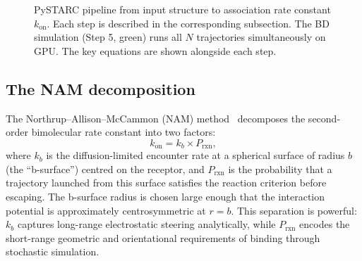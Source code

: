 \documentclass[journal=jctcce,manuscript=article,layout=twocolumn]{achemso}
\newcommand{\kon}{k_{\mathrm{on}}}
\newcommand{\Prxn}{P_{\mathrm{rxn}}}
\begin{document}
\begin{figure}[t]
\caption{PySTARC pipeline from input structure to association rate constant $\kon$.
Each step is described in the corresponding subsection.
The BD simulation (Step 5, green) runs all $N$ trajectories simultaneously on GPU.
The key equations are shown alongside each step.}
\label{fig:flowchart}
\end{figure}

\subsection{The NAM decomposition}

The Northrup--Allison--McCammon (NAM) method~\cite{Northrup1984}
decomposes the second-order bimolecular rate constant into two
factors:
\begin{equation}
\kon = k_b \times \Prxn,
\label{eq:nam}
\end{equation}
where $k_b$ is the diffusion-limited encounter rate at a spherical
surface of radius $b$ (the ``b-surface'') centred on the receptor,
and $\Prxn$ is the probability that a trajectory launched from
this surface satisfies the reaction criterion before escaping.
The b-surface radius is chosen large enough that the interaction
potential is approximately centrosymmetric at $r = b$.
This separation is powerful: $k_b$ captures long-range electrostatic
steering analytically, while $\Prxn$ encodes the short-range
geometric and orientational requirements of binding through
stochastic simulation.
\end{document}
